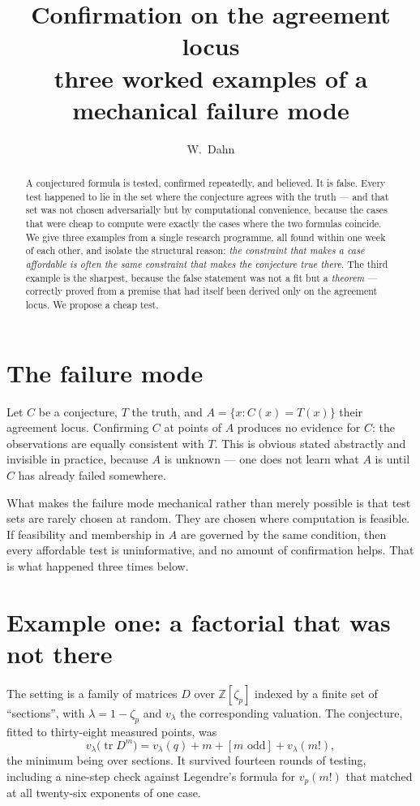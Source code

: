 \documentclass[11pt]{article}
\title{Confirmation on the agreement locus\\
{\large three worked examples of a mechanical failure mode}}
\author{W.~Dahn}
\date{}
\theoremstyle{plain}
\theoremstyle{definition}
\newcommand{\ZZ}{\mathbb Z}
\newcommand{\vlam}{v_\lambda}
\begin{document}
\maketitle

\begin{abstract}
\noindent A conjectured formula is tested, confirmed repeatedly, and believed.
It is false. Every test happened to lie in the set where the conjecture agrees
with the truth --- and that set was not chosen adversarially but by
computational convenience, because the cases that were cheap to compute were
exactly the cases where the two formulas coincide. We give three examples from
a single research programme, all found within one week of each other, and
isolate the structural reason: \emph{the constraint that makes a case
affordable is often the same constraint that makes the conjecture true there}.
The third example is the sharpest, because the false statement was not a fit
but a \emph{theorem} --- correctly proved from a premise that had itself been
derived only on the agreement locus. We propose a cheap test.
\end{abstract}

\section{The failure mode}

Let $C$ be a conjecture, $T$ the truth, and $A=\{x: C(x)=T(x)\}$ their agreement
locus. Confirming $C$ at points of $A$ produces no evidence for $C$: the
observations are equally consistent with $T$. This is obvious stated abstractly
and invisible in practice, because $A$ is unknown --- one does not learn what
$A$ is until $C$ has already failed somewhere.

What makes the failure mode mechanical rather than merely possible is that test
sets are rarely chosen at random. They are chosen where computation is
feasible. If feasibility and membership in $A$ are governed by the same
condition, then every affordable test is uninformative, and no amount of
confirmation helps. That is what happened three times below.

\section{Example one: a factorial that was not there}

The setting is a family of matrices $D$ over $\ZZ[\zeta_p]$ indexed by a finite
set of ``sections'', with $\lambda=1-\zeta_p$ and $\vlam$ the corresponding
valuation. The conjecture, fitted to thirty-eight measured points, was
\begin{equation}\label{eq:C}
\vlam\bigl(\operatorname{tr}D^m\bigr)
=\vlam(q)+m+[m\text{ odd}]+\vlam(m!),
\end{equation}
the minimum being over sections. It survived fourteen rounds of testing,
including a nine-step check against Legendre's formula for $v_p(m!)$ that
matched at all twenty-six exponents of one case.
\end{document}
